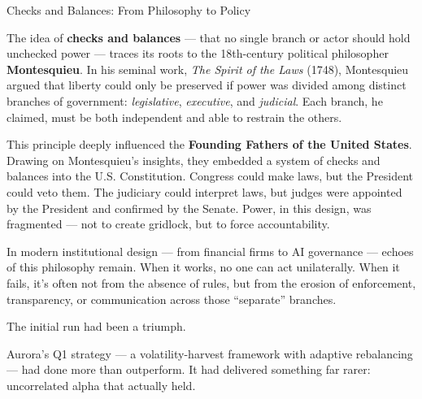\medskip

\begin{HistoricalSidebar}{Checks and Balances: From Philosophy to Policy}

  The idea of \textbf{checks and balances} — that no single branch or actor should hold unchecked power — traces its 
  roots to the 18th-century political philosopher \textbf{Montesquieu}. In his seminal work, \textit{The Spirit of the 
  Laws} (1748), Montesquieu argued that liberty could only be preserved if power was divided among distinct branches 
  of government: \textit{legislative}, \textit{executive}, and \textit{judicial}. Each branch, he claimed, must be 
  both independent and able to restrain the others.
  
  This principle deeply influenced the \textbf{Founding Fathers of the United States}. Drawing on Montesquieu’s insights, 
  they embedded a system of checks and balances into the U.S. Constitution. Congress could make laws, but the President 
  could veto them. The judiciary could interpret laws, but judges were appointed by the President and confirmed by the 
  Senate. Power, in this design, was fragmented — not to create gridlock, but to force accountability.
  
  \medskip
  
  In modern institutional design --- from financial firms to AI governance --- echoes of this philosophy remain. When it works, 
  no one can act unilaterally. When it fails, it’s often not from the absence of rules, but from the erosion of enforcement, 
  transparency, or communication across those “separate” branches.
  
\end{HistoricalSidebar}

\medskip

The initial run had been a triumph.

Aurora’s Q1 strategy — a volatility-harvest framework with adaptive rebalancing — had done more than 
outperform. It had delivered something far rarer: uncorrelated alpha that actually held.

\medskip

